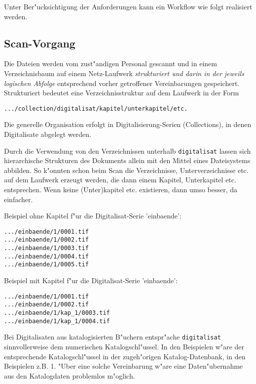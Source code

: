 \documentclass[11pt, twoside, a4paper, BCOR8mm, DIV12, bibtotoc,idxtotoc]{scrreprt}
\begin{document}
Unter Ber"ucksichtigung der Anforderungen kann ein Workflow wie folgt
realisiert werden.

\subsection{Scan-Vorgang}

Die Dateien werden vom zust"andigen Personal gescannt und in einem
Verzeichnisbaum auf einem Netz-Laufwerk \emph{struk\-tu\-riert und
  darin in der jeweils logischen Abfolge} entsprechend vorher
getroffener Vereinbarungen gespeichert. Strukturiert bedeutet eine
Verzeich\-nis\-struk\-tur auf dem Laufwerk in der Form

\begin{verbatim}
.../collection/digitalisat/kapitel/unterkapitel/etc.
\end{verbatim}

Die generelle Organisation erfolgt in Digitalisierung-Serien
(Collections), in denen Digitalisate abgelegt werden. 

Durch die Verwendung von den Verzeichnissen unterhalb
\texttt{digitalisat} lassen sich hierarchische Strukturen des
Dokuments allein mit den Mittel eines Dateisystems abbilden. So
k"onnten schon beim Scan die Verzeichnisse, Unterverzeich\-nis\-se
etc. auf dem Laufwerk erzeugt werden, die dann einem Kapitel,
Unterkapitel etc.  entsprechen. Wenn keine (Unter)kapitel etc.
existieren, dann umso besser, da einfacher.


Beispiel ohne Kapitel f"ur die Digitalisat-Serie 'einbaende':

\begin{verbatim}
.../einbaende/1/0001.tif
.../einbaende/1/0002.tif
.../einbaende/1/0003.tif
.../einbaende/1/0004.tif
.../einbaende/1/0005.tif
\end{verbatim}

Beispiel mit Kapitel f"ur die Digitalisat-Serie 'einbaende':

\begin{verbatim}
.../einbaende/1/0001.tif
.../einbaende/1/0002.tif
.../einbaende/1/kap_1/0003.tif
.../einbaende/1/kap_1/0004.tif
\end{verbatim}

Bei Digitalisaten aus katalogisierten B"uchern entspr"ache
\texttt{digitalisat} sinnvollerweise dem numerischen
Katalogschl"ussel. In den Beispielen w"are der entsprechende
Katalogschl"ussel in der zugeh"origen Katalog-Datenbank, in den
Beispielen z.B. 1. "Uber eine solche Vereinbarung w"are eine
Daten"uber\-nahme aus den Katalogdaten problemlos m"oglich.
\end{document}
